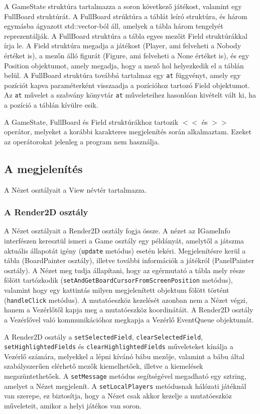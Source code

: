 \documentclass[12pt, twoside]{report}
\begin{document}
A GameState struktúra tartalmazza a soron következő játékost, valamint egy FullBoard struktúrát. A FullBoard strúktúra a táblát leíró struktúra, és három egymásba ágyazott std::vector-ból áll, amelyek a tábla három tengelyét reprezentálják. A FullBoard struktúra a tábla egyes mezőit Field struktúrákkal írja le. A Field struktúra megadja a játékost (Player, ami felveheti a Nobody értéket is), a mezőn álló figurát (Figure, ami felveheti a None értéket is), és egy Position objektumot, amely megadja, hogy a mező hol helyezkedik el a táblán belül. A FullBoard struktúra továbbá tartalmaz egy {\tt at} függvényt, amely egy pozíciót kapva paraméterként visszaadja a pozícióhoz tartozó Field objektumot. Az {\tt at} művelet a szabvány könyvtár {\tt at} műveleteihez hasonlóan kivételt vált ki, ha a pozíció a táblán kívülre esik.

A GameState, FullBoard és Field struktúrákhoz tartozik $<<$ és $>>$ operátor, melyeket a korábbi karakteres megjelenítés során alkalmaztam. Ezeket az operátorokat jelenleg a program nem használja.

\subsection{A megjelenítés}

A Nézet osztályait a View névtér tartalmazza.

\subsubsection{A Render2D osztály}

A Nézet osztályait a Render2D osztály fogja össze. A nézet az IGameInfo interfészen keresztül ismeri a Game osztály egy példányát, amelytől a játszma aktuális állapotát igény ({\tt update} metódus) esetén lekéri. Megjelenítésre kerül a tábla (BoardPainter osztály), illetve további információk a játékról (PanelPainter osztály). A Nézet meg tudja állapítani, hogy az egérmutató a tábla mely része fölött tartózkodik ({\tt setAndGetBoardCursorFromScreenPosition} metódus), valamint hogy egy kattintás milyen megjelenített objektum fölött történt ({\tt handleClick} metódus). A mutatóeszköz kezelését azonban nem a Nézet végzi, hanem a Vezérlőtől kapja meg a mutatóeszköz koordinátáit. A Render2D osztály a Vezérlővel való kommunikációhoz megkapja a Vezérlő EventQueue objektumát.

A Render2D osztály a {\tt setSelectedField}, {\tt clearSelectedField}, {\tt setHighlightedFields} és {\tt clearHighlightedFields} műveleteket kínálja a Vezérlő számára, melyekkel a lépni kívánó bábu mezője, valamint a bábu által szabályszerűen elérhető mezők kiemelhetőek, illetve a kiemelések megszüntethetőek. A {\tt setMessage} metódus segítségével megadható egy sztring, amelyet a Nézet megjelenít. A {\tt setLocalPlayers} metódusnak hálózati játéknál van szerepe, ez biztosítja, hogy a Nézet csak akkor kezelje a mutatóeszköz műveleteit, amikor a helyi játékos van soron.
\end{document}
